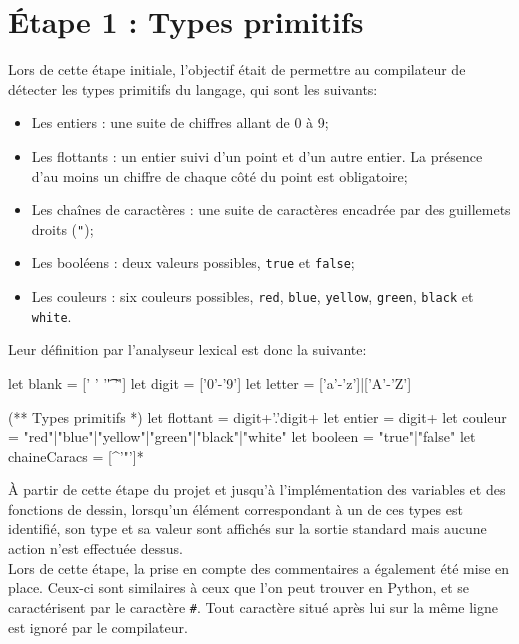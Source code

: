 \documentclass[a4paper, 12pt]{report}
\begin{document}
\chapter{\'Etape 1 : Types primitifs}
    
    Lors de cette étape initiale, l'objectif était de permettre au compilateur de détecter les types primitifs du langage, qui sont les suivants:\\
    
    \begin{itemize}
    	\item Les entiers : une suite de chiffres allant de 0 à 9;
    	\item Les flottants : un entier suivi d'un point et d'un autre entier. La présence d'au moins un chiffre de chaque côté du point est obligatoire;
    	\item Les cha\^ines de caractères : une suite de caractères encadrée par des guillemets droits (\texttt{"});
    	\item Les booléens : deux valeurs possibles, \texttt{true} et \texttt{false};
    	\item Les couleurs : six couleurs possibles, \texttt{red}, \texttt{blue}, \texttt{yellow}, \texttt{green}, \texttt{black} et \texttt{white}.\\
    \end{itemize}
    
    Leur définition par l'analyseur lexical est donc la suivante:
    
    \begin{verbatimtab}[4]
    	let blank = [' ' '\t' '\r']
		let digit = ['0'-'9']
		let letter = ['a'-'z']|['A'-'Z']

		(** Types primitifs *)
		let flottant = digit+'.'digit+
		let entier = digit+
		let couleur = "red"|"blue"|"yellow"|"green"|"black"|"white"
		let booleen = "true"|"false"
		let chaineCaracs =  [^'"']*
    \end{verbatimtab}
    
    \`A partir de cette étape du projet et jusqu'à l'implémentation des variables et des fonctions de dessin, lorsqu'un élément correspondant à un de ces types est identifié, son type et sa valeur sont affichés sur la sortie standard mais aucune action n'est effectuée dessus.\\
    
    Lors de cette étape, la prise en compte des commentaires a également été mise en place. Ceux-ci sont similaires à ceux que l'on peut trouver en Python, et se caractérisent par le caractère \texttt{\#}. Tout caractère situé après lui sur la même ligne est ignoré par le compilateur.\\
    
\end{document}
